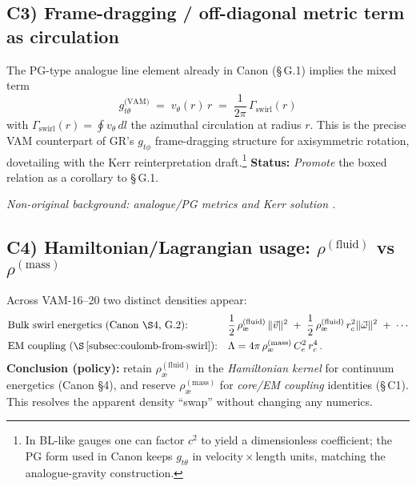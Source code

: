 \documentclass[11pt]{article}
\begin{document}
    \subsection*{C3) Frame-dragging / off-diagonal metric term as circulation}
    \label{subsec:metric-circulation}

    The PG-type analogue line element already in Canon (\S\,G.1) implies the mixed term
    \[
        \boxed{ g_{t\theta}^{\text{(VAM)}} \;=\; v_\theta(r)\,r \;=\; \frac{1}{2\pi}\,\Gamma_{\text{swirl}}(r) }
    \]
    with $\Gamma_{\text{swirl}}(r)=\oint v_\theta\,dl$ the azimuthal circulation at radius $r$.
    This is the precise VAM counterpart of GR's $g_{t\phi}$ frame-dragging structure for axisymmetric rotation, dovetailing with the Kerr reinterpretation draft.\footnote{In BL-like gauges one can factor $c^2$ to yield a dimensionless coefficient; the PG form used in Canon keeps $g_{t\theta}$ in velocity\,$\times$\,length units, matching the analogue-gravity construction.}
    \textbf{Status:} \emph{Promote} the boxed relation as a corollary to \S\,G.1.

    \textit{Non-original background: analogue/PG metrics and Kerr solution \cite{Painleve1921,Gullstrand1922,Unruh1981,Visser1998,Kerr1963}.}

    \subsection*{C4) Hamiltonian/Lagrangian usage: $\rho^{(\text{fluid})}$ vs $\rho^{(\text{mass})}$}
    \label{subsec:rho-policy}

    Across VAM-16–20 two distinct densities appear:
    \begin{align*}
        &\text{Bulk swirl energetics (Canon \S4, G.2):}
        &&\frac{1}{2}\,\rho_{\text{\ae}}^{(\text{fluid})}\,\lVert \vec v\rVert^2
        \;+\;\frac{1}{2}\,\rho_{\text{\ae}}^{(\text{fluid})}\,r_c^{2}\lVert \vec\omega\rVert^2
        \;+\;\cdots \\
        &\text{EM coupling (\S\,\ref{subsec:coulomb-from-swirl}):}
        &&\Lambda = 4\pi\,\rho_{\text{\ae}}^{(\text{mass})}\,C_e^2\,r_c^4\,.
    \end{align*}
    \textbf{Conclusion (policy):} retain $\rho_{\text{\ae}}^{(\text{fluid})}$ in the \emph{Hamiltonian kernel} for continuum energetics (Canon \S4), and reserve $\rho_{\text{\ae}}^{(\text{mass})}$ for \emph{core/EM coupling} identities (\S\,C1). This resolves the apparent density ``swap'' without changing any numerics.
\end{document}
